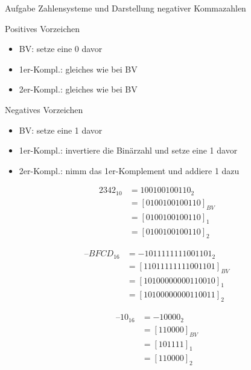 \begin{frame}[allowframebreaks]{Aufgabe \thesection}{Zahlensysteme und Darstellung negativer Kommazahlen}
{        \begin{block}{Positives Vorzeichen}
            \begin{itemize}
                \item BV: setze eine 0 davor
                \item 1er-Kompl.: gleiches wie bei BV
                \item 2er-Kompl.: gleiches wie bei BV
            \end{itemize}
        \end{block}
        \begin{block}{Negatives Vorzeichen}
            \begin{itemize}
                \item BV: setze eine 1 davor
                \item 1er-Kompl.: invertiere die Binärzahl und setze eine 1 davor
                \item 2er-Kompl.: nimm das 1er-Komplement und addiere 1 dazu
            \end{itemize}
        \end{block}
    }\fi
  \begin{solution}
    \begin{align*}
      2342_{10} &= 100100100110_2 \\
      &= [0100100100110]_{BV} \\
      &= [0100100100110]_{1} \\
      &= [0100100100110]_{2}
    \end{align*}
  \end{solution}
  \begin{solution}
    \begin{align*}
      –BFCD_{16} &= - 1011 1111 1100 1101_2\\ 
                 &= [11011 1111 1100 1101]_{BV}\\ 
                 &= [1 0100 0000 0011 0010]_1\\ 
                 &= [1 0100 0000 0011 0011]_2
    \end{align*}
  \end{solution}
  \begin{solution}
    \begin{align*}
      –10_{16} &= - 1 0000_2 \\ 
      &= [11 0000]_{BV} \\ 
      &= [10 1111]_1 \\ 
      &= [11 0000]_2
    \end{align*}
  \end{solution}

\end{frame}
